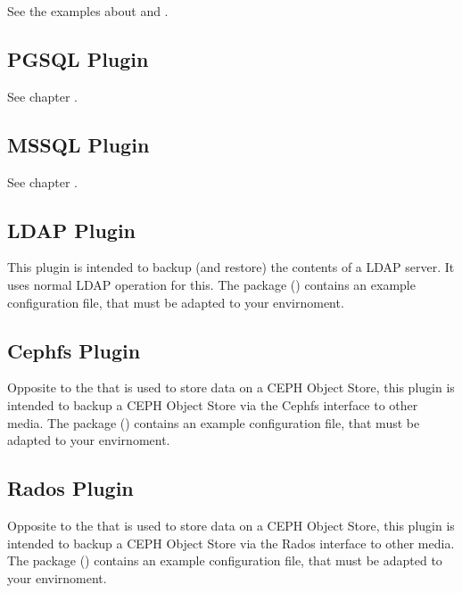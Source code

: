 See the examples about  and .


\subsection{PGSQL Plugin}

See chapter .


\subsection{MSSQL Plugin}

See chapter .

\subsection{LDAP Plugin}

This plugin is intended to backup (and restore) the contents of a LDAP server.
It uses normal LDAP operation for this.
The package  () contains an example configuration file, that must be adapted to your envirnoment.

\subsection{Cephfs Plugin}

Opposite to the  that is used to store data on a CEPH Object Store,
this plugin is intended to backup a CEPH Object Store via the Cephfs interface to other media.
The package  () contains an example configuration file, that must be adapted to your envirnoment.

\subsection{Rados Plugin}

Opposite to the  that is used to store data on a CEPH Object Store,
this plugin is intended to backup a CEPH Object Store via the Rados interface to other media.
The package  () contains an example configuration file, that must be adapted to your envirnoment.



